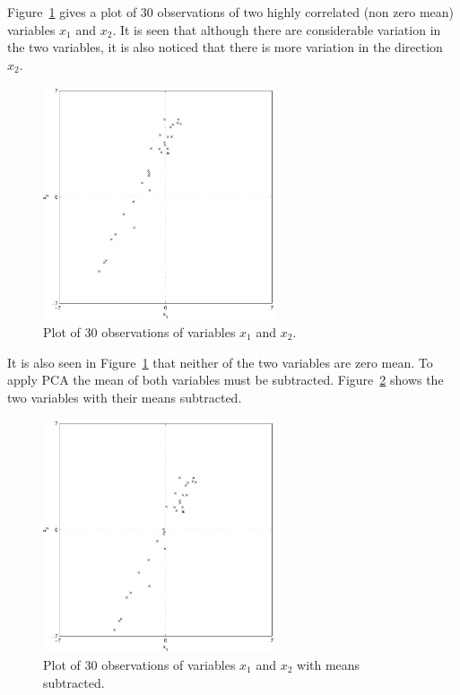 Figure~\ref{fig:30observations} gives a plot of 30 observations of two highly correlated (non zero mean) variables $x_1$ and $x_2$. It is seen that although there are considerable variation in the two variables, it is also noticed that there is more variation in the direction $x_2$.
\begin{figure}[!]
  \begin{center}
    \includegraphics[width=260px]{30observations.pdf}
    \caption{Plot of 30 observations of variables $x_1$ and $x_2$.}\label{fig:30observations}
  \end{center}
\end{figure}

It is also seen in Figure~\ref{fig:30observations} that neither of the two variables are zero mean. To apply PCA the mean of both variables must be subtracted. Figure~\ref{fig:30observationsBar} shows the two variables with their means subtracted.
\begin{figure}[!]
  \begin{center}
    \includegraphics[width=260px]{30observationsBar.pdf}
    \caption{Plot of 30 observations of variables $x_1$ and $x_2$ with means subtracted.}\label{fig:30observationsBar}
  \end{center}
\end{figure}

